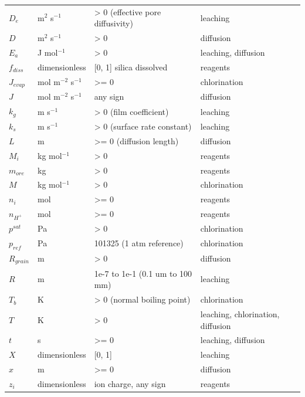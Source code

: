 \documentclass[10pt,a4paper,twoside]{report}
\begin{document}
\begin{longtable}{@{}p{}p{}p{}p{}@{}}
$D_e$ & m$^{2}$ s$^{-1}$ & > 0 (effective pore diffusivity) & leaching \\

$D$ & m$^{2}$ s$^{-1}$ & > 0 & diffusion \\

$E_a$ & J mol$^{-1}$ & > 0 & leaching, diffusion \\

$f_{diss}$ & dimensionless & [0, 1] silica dissolved & reagents \\

$J_{evap}$ & mol m$^{-2}$ s$^{-1}$ & >= 0 & chlorination \\

$J$ & mol m$^{-2}$ s$^{-1}$ & any sign & diffusion \\

$k_g$ & m s$^{-1}$ & > 0 (film coefficient) & leaching \\

$k_s$ & m s$^{-1}$ & > 0 (surface rate constant) & leaching \\

$L$ & m & >= 0 (diffusion length) & diffusion \\

$M_i$ & kg mol$^{-1}$ & > 0 & reagents \\

$m_{ore}$ & kg & > 0 & reagents \\

$M$ & kg mol$^{-1}$ & > 0 & chlorination \\

$n_i$ & mol & >= 0 & reagents \\

$n_{H^+}$ & mol & >= 0 & reagents \\

$p^{sat}$ & Pa & > 0 & chlorination \\

$p_{ref}$ & Pa & 101325 (1 atm reference) & chlorination \\

$R_{grain}$ & m & > 0 & diffusion \\

$R$ & m & 1e-7 to 1e-1 (0.1 um to 100 mm) & leaching \\

$T_b$ & K & > 0 (normal boiling point) & chlorination \\

$T$ & K & > 0 & leaching, chlorination, diffusion \\

$t$ & s & >= 0 & leaching, diffusion \\

$X$ & dimensionless & [0, 1] & leaching \\

$x$ & m & >= 0 & diffusion \\

$z_i$ & dimensionless & ion charge, any sign & reagents \\

\bottomrule \end{longtable}
\end{document}

